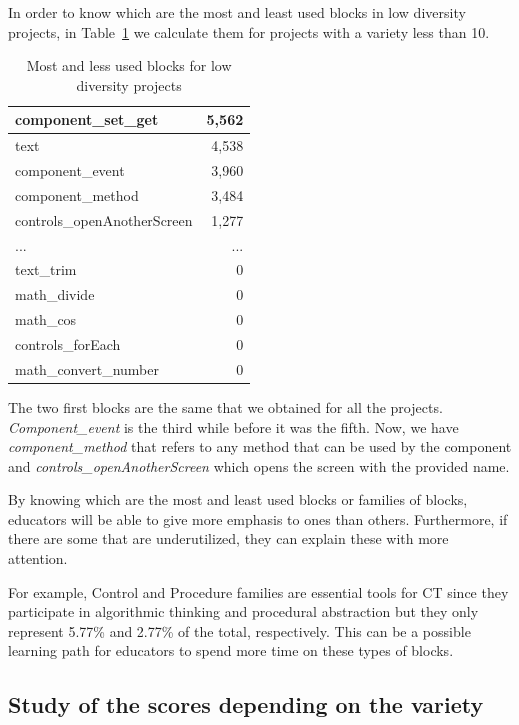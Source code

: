 \documentclass[a4paper]{article}
\begin{document}
In order to know which are the most and least used blocks in low diversity projects, in Table~\ref{tab:most-least-low} we calculate them for projects with a variety less than 10.

\begin{table}[ht]
\begin{center}
\caption{Most and less used blocks for low diversity projects}
\bigskip
\label{tab:most-least-low}
\begin{tabular}{|l|r|}
\hline
component\_set\_get & 5,562\\ \hline
text & 4,538\\ \hline
component\_event & 3,960\\ \hline
component\_method & 3,484\\ \hline
controls\_openAnotherScreen & 1,277\\ \hline
... & ... \\ \hline
text\_trim & 0\\ \hline
math\_divide & 0\\ \hline
math\_cos & 0\\ \hline
controls\_forEach & 0\\ \hline
math\_convert\_number & 0\\ \hline
\end{tabular}
\end{center}
\end{table}

The two first blocks are the same that we obtained for all the projects. \emph{Component\_event} is the third while before it was the fifth. Now, we have \emph{component\_method} that refers to any method that can be used by the component and \emph{controls\_openAnotherScreen} which opens the screen with the provided name.

By knowing which are the most and least used blocks or families of blocks, educators will be able to give more emphasis to ones than others. Furthermore, if there are some that are underutilized, they can explain these with more attention.

For example, Control and Procedure families are essential tools for CT since they participate in algorithmic thinking and procedural abstraction but they only represent 5.77\% and 2.77\% of the total, respectively. This can be a possible learning path for educators to spend more time on these types of blocks.


\subsection{Study of the scores depending on the variety}
\end{document}
